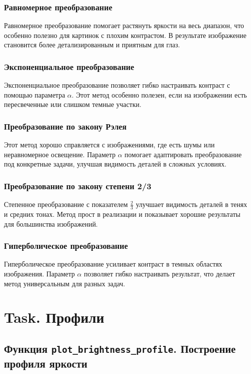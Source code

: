 \documentclass[a4paper,12pt]{article}
\begin{document}
\subsubsection{Равномерное преобразование}
Равномерное преобразование помогает растянуть яркости на весь диапазон, что особенно полезно для картинок с плохим контрастом. В результате изображение становится более детализированным и приятным для глаз.

\subsubsection{Экспоненциальное преобразование}
Экспоненциальное преобразование позволяет гибко настраивать контраст с помощью параметра \( \alpha \). Этот метод особенно полезен, если на изображении есть пересвеченные или слишком темные участки.

\subsubsection{Преобразование по закону Рэлея}
Этот метод хорошо справляется с изображениями, где есть шумы или неравномерное освещение. Параметр \( \alpha \) помогает адаптировать преобразование под конкретные задачи, улучшая видимость деталей в сложных условиях.

\subsubsection{Преобразование по закону степени 2/3}
Степенное преобразование с показателем \( \frac{2}{3} \) улучшает видимость деталей в тенях и средних тонах. Метод прост в реализации и показывает хорошие результаты для большинства изображений.

\subsubsection{Гиперболическое преобразование}
Гиперболическое преобразование усиливает контраст в темных областях изображения. Параметр \( \alpha \) позволяет гибко настраивать результат, что делает метод универсальным для разных задач.


\section{Task. Профили}

\subsection{Функция \texttt{plot\_brightness\_profile}. Построение профиля яркости}
\end{document}
